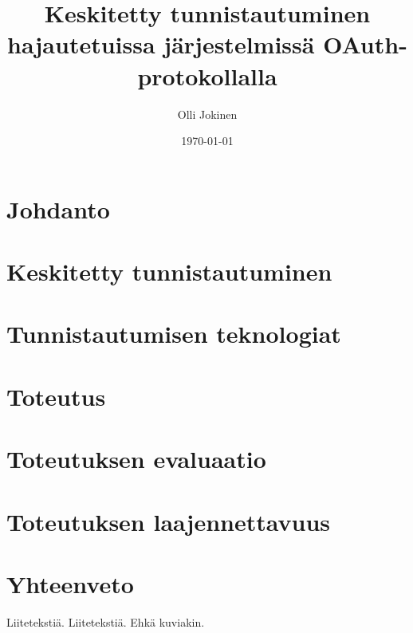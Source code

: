 \documentclass{tktltiki}
\begin{document}
\title{Keskitetty tunnistautuminen hajautetuissa järjestelmissä OAuth-protokollalla}
\author{Olli Jokinen}
\date{\today}
\maketitle
\doublespacing
{}
\subject{Tietojenkäsittelytiede}
\additionalinformation{}
\begin{abstract}

\end{abstract}
\mytableofcontents
\section{Johdanto}

\section{Keskitetty tunnistautuminen}

\section{Tunnistautumisen teknologiat}

\section{Toteutus}

\section{Toteutuksen evaluaatio}

\section{Toteutuksen laajennettavuus}

\section{Yhteenveto}



\lastpage
\appendices
{}
Liitetekstiä.
Liitetekstiä. Ehkä kuviakin.
\end{document}
